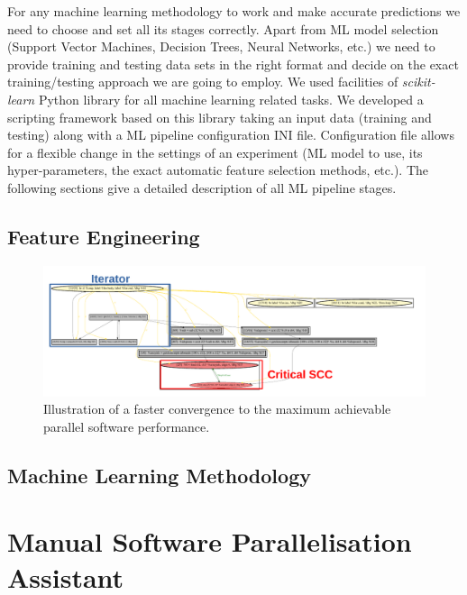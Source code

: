 \documentclass{acaces}
\begin{document}
\quad For any machine learning methodology to work and make accurate predictions we need to choose and set all its stages correctly. Apart from ML model selection (Support Vector Machines, Decision Trees, Neural Networks, etc.) we need to provide training and testing data sets in the right format and decide on the exact training/testing approach we are going to employ.\newline\null
\quad We used facilities of \textit{scikit-learn} \cite{scikit-learn} Python library for all machine learning related tasks. We developed a scripting framework based on this library taking an input data (training and testing) along with a ML pipeline configuration INI file. Configuration file allows for a flexible change in the settings of an experiment (ML model to use, its hyper-parameters, the exact automatic feature selection methods, etc.). The following sections give a detailed description of all ML pipeline stages.\newline\null

\subsection{Feature Engineering}

\begin{figure}
\centering
\includegraphics[width=1.0\textwidth]{pdg_example}
\caption{Illustration of a faster convergence to the maximum achievable parallel software performance.}
\label{logo}
\end{figure}

\subsection{Machine Learning Methodology}



\section{Manual Software Parallelisation Assistant}
\end{document}

